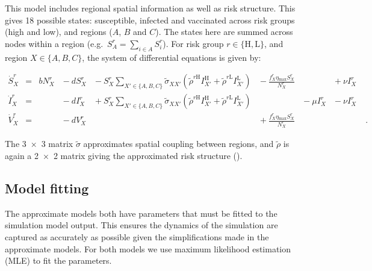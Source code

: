 This model includes regional spatial information as well as risk structure. This gives 18 possible states: susceptible, infected and vaccinated across risk groups (high and low), and regions ($A$, $B$ and $C$). The states here are summed across nodes within a region (e.g.\ $S^r_A = \sum_{i\in{}A}S^r_i$). For risk group $r\in{}\{\mathrm{H,L}\}$, and region $X\in{}\{A,B,C\}$, the system of differential equations is given by:
\begin{linenomath*}
    \begin{equation}
        \begin{alignedat}{7}
            \dot{S}^r_X &={} &bN^r_X &{}-{} dS^r_X &{}-{} S^r_X\sum_{X'\in\{A,B,C\}}\tilde{\sigma}_{XX'}\left(\tilde{\rho}^{r\mathrm{H}}I^{\mathrm{H}}_{X'} + \tilde{\rho}^{r\mathrm{L}}I^{\mathrm{L}}_{X'}\right) &{}-{} \frac{f^r_X\eta{}_\mathrm{max}S^r_X}{N^r_X} &&{}+{} \nu{}I^r_X \\
            \dot{I}^r_X &={}  &&{}-{} dI^r_X &{}+{} S^r_X\sum_{X'\in\{A,B,C\}}\tilde{\sigma}_{XX'}\left(\tilde{\rho}^{r\mathrm{H}}I^{\mathrm{H}}_{X'} + \tilde{\rho}^{r\mathrm{L}}I^{\mathrm{L}}_{X'}\right)& &{}-{} \mu{}I^r_X &{}-{} \nu{}I^r_X \\
            \dot{V}^r_X &={}  &&{}-{} dV^r_X &&{}+{} \frac{f^r_X\eta{}_\mathrm{max}S^r_X}{N^r_X}&&&\;.
        \end{alignedat}
        \label{eq:space_model}
    \end{equation}
\end{linenomath*}
The \num{3x3} matrix $\tilde{\sigma}$ approximates spatial coupling between regions, and $\tilde{\rho}$ is again a \num{2x2} matrix giving the approximated risk structure ().

\subsection{Model fitting\label{sec:ch4:model_fitting}}


The approximate models both have parameters that must be fitted to the simulation model output. This ensures the dynamics of the simulation are captured as accurately as possible given the simplifications made in the approximate models. For both models we use maximum likelihood estimation (MLE) to fit the parameters. \citationneeded

